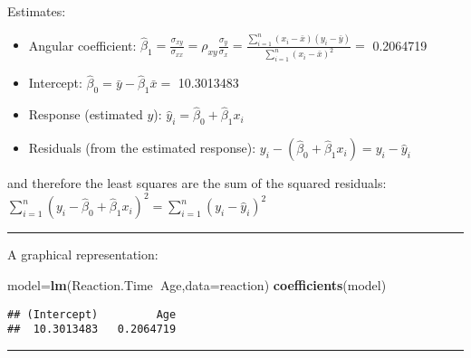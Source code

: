 \documentclass[]{article}
\newenvironment{Shaded}{\begin{snugshade}}{\end{snugshade}}
\newcommand{\KeywordTok}[1]{\textcolor[rgb]{0.13,0.29,0.53}{\textbf{#1}}}
\newcommand{\DataTypeTok}[1]{\textcolor[rgb]{0.13,0.29,0.53}{#1}}
\newcommand{\DecValTok}[1]{\textcolor[rgb]{0.00,0.00,0.81}{#1}}
\newcommand{\StringTok}[1]{\textcolor[rgb]{0.31,0.60,0.02}{#1}}
\newcommand{\OperatorTok}[1]{\textcolor[rgb]{0.81,0.36,0.00}{\textbf{#1}}}
\newcommand{\NormalTok}[1]{#1}
\providecommand{\tightlist}{%
  \setlength{\itemsep}{0pt}\setlength{\parskip}{0pt}}
\begin{document}
Estimates:

\begin{itemize}
\tightlist
\item
  Angular coefficient:
  \(\hat{\beta}_1=\frac{\sigma_{xy}}{\sigma_{xx}}=\rho_{xy}\frac{\sigma_{y}}{\sigma_{x}}=\frac{\sum_{i=1}^n(x_i- \bar{x})(y_i-\bar{y})}{\sum_{i=1}^n (x_i-\bar{x})^2}=\)
  0.2064719\\
\item
  Intercept: \(\hat{\beta}_0=\bar{y}-\hat{\beta}_1\bar{x}=\) 10.3013483
\item
  Response (estimated \(y\)):
  \(\hat{y}_i=\hat{\beta}_0 + \hat{\beta}_1x_i\)
\item
  Residuals (from the estimated response):
  \(y_i - (\hat{\beta}_0 + \hat{\beta}_1 x_i)=y_i- \hat{y}_i\)
\end{itemize}

and therefore the least squares are the sum of the squared residuals:
\(\sum_{i=1} ^ n (y_i- \hat{\beta}_0 + \hat{\beta}_1x_i) ^ 2=\sum_{i=1} ^ n (y_i- \hat{y}_i ) ^ 2\)

\begin{center}\rule{0.5\linewidth}{\linethickness}\end{center}

A graphical representation:

\begin{Shaded}
\begin{Highlighting}[]
\NormalTok{model=}\KeywordTok{lm}\NormalTok{(Reaction.Time}\OperatorTok{~}\NormalTok{Age,}\DataTypeTok{data=}\NormalTok{reaction)}
\KeywordTok{coefficients}\NormalTok{(model)}
\end{Highlighting}
\end{Shaded}

\begin{verbatim}
## (Intercept)         Age 
##  10.3013483   0.2064719
\end{verbatim}

\begin{center}\rule{0.5\linewidth}{\linethickness}\end{center}

\begin{Shaded}
\end{Shaded}
\end{document}

